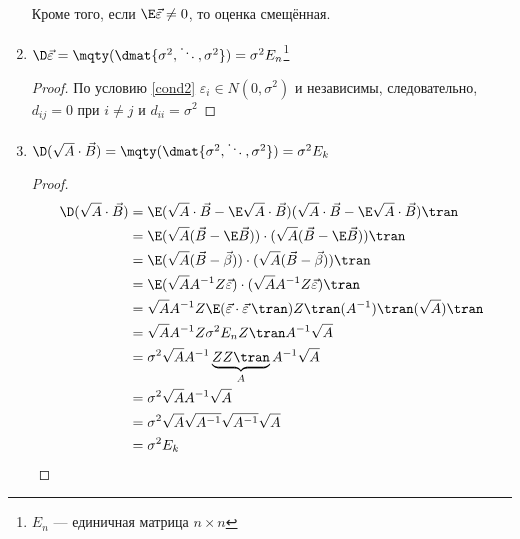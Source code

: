 \begin{prop}
\begin{enumerate}
              Кроме того, если \(\E \vec{\varepsilon} \neq 0\), то оценка смещённая.
        \item \(\D \vec{\varepsilon} =
              \mqty(\dmat{\sigma^2,\ddots,\sigma^2}) = \sigma^2 E_n\)\footnote{\(E_n\) --- единичная матрица \(n \times n\)}
              \begin{proof}
                  По условию \ref{cond2} \(\varepsilon_i \in N(0, \sigma^2)\) и независимы, следовательно, \(d_{ij} = 0\) при \(i \neq j\) и \(d_{ii} = \sigma^2\)
              \end{proof}
        \item \(\D (\sqrt{A} \cdot \vec{B}) = \mqty(\dmat{\sigma^2,\ddots,\sigma^2}) = \sigma^2 E_k\) \label{prop4}
              \begin{proof}
                  \begin{align*}
                      \D (\sqrt{A} \cdot \vec{B})
                       & = \E(\sqrt{A} \cdot \vec{B} - \E \sqrt{A} \cdot \vec{B})(\sqrt{A} \cdot \vec{B} - \E \sqrt{A} \cdot \vec{B})\tran \\
                       & = \E (\sqrt{A} (\vec{B} - \E \vec{B})) \cdot (\sqrt{A} (\vec{B} - \E \vec{B}))\tran                               \\
                       & = \E (\sqrt{A} (\vec{B} - \vec{\beta})) \cdot (\sqrt{A} (\vec{B} - \vec{\beta}))\tran                             \\
                       & = \E (\sqrt{A} A^{-1}Z \vec{\varepsilon}) \cdot (\sqrt{A} A^{-1}Z \vec{\varepsilon})\tran                         \\
                       & = \sqrt{A} A^{-1}Z \E(\vec{\varepsilon} \cdot \vec{\varepsilon}\,\tran) Z\tran (A^{-1})\tran (\sqrt{A})\tran      \\
                       & = \sqrt{A} A^{-1}Z \sigma^2 E_n Z\tran A^{-1} \sqrt{A}                                                            \\
                       & = \sigma^2 \sqrt{A} A^{-1}\underbrace{Z Z\tran}_{A} A^{-1} \sqrt{A}                                               \\
                       & = \sigma^2 \sqrt{A} A^{-1} \sqrt{A}                                                                               \\
                       & = \sigma^2 \sqrt{A} \sqrt{A^{-1}} \sqrt{A^{-1}} \sqrt{A}                                                          \\
                       & = \sigma^2 E_k                                                                                                    \\
                  \end{align*}
              \end{proof}


\end{enumerate}
\end{prop}
